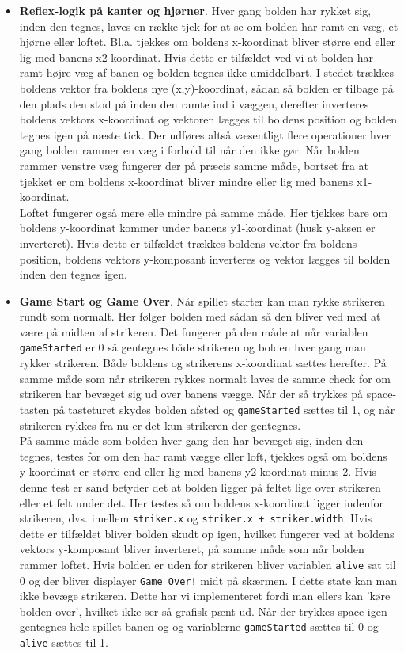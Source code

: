 \begin{itemize}
\item \textbf{Reflex-logik på kanter og hjørner}. Hver gang bolden har rykket sig, inden den tegnes, laves en række tjek for at se om bolden har ramt en væg, et hjørne eller loftet. Bl.a. tjekkes om boldens x-koordinat bliver større end eller lig med banens x2-koordinat. Hvis dette er tilfældet ved vi at bolden har ramt højre væg af banen og bolden tegnes ikke umiddelbart. I stedet trækkes boldens vektor fra boldens nye (x,y)-koordinat, sådan så bolden er tilbage på den plads den stod på inden den ramte ind i væggen, derefter inverteres boldens vektors x-koordinat og vektoren lægges til boldens position og bolden tegnes igen på næste tick. Der udføres altså væsentligt flere operationer hver gang bolden rammer en væg i forhold til når den ikke gør. Når bolden rammer venstre væg fungerer der på præcis samme måde, bortset fra at tjekket er om boldens x-koordinat bliver mindre eller lig med banens x1-koordinat.\\

Loftet fungerer også mere elle mindre på samme måde. Her tjekkes bare om boldens y-koordinat kommer under banens y1-koordinat (husk y-aksen er inverteret). Hvis dette er tilfældet trækkes boldens vektor fra boldens position, boldens vektors y-komposant inverteres og vektor lægges til bolden inden den tegnes igen.


\item \textbf{Game Start og Game Over}. Når spillet starter kan man rykke strikeren rundt som normalt. Her følger bolden med sådan så den bliver ved med at være på midten af strikeren. Det fungerer på den måde at når variablen \texttt{gameStarted} er 0 så gentegnes både strikeren og bolden hver gang man rykker strikeren. Både boldens og strikerens x-koordinat sættes herefter. På samme måde som når strikeren rykkes normalt laves de samme check for om strikeren har bevæget sig ud over banens vægge. Når der så trykkes på space-tasten på tasteturet skydes bolden afsted og \texttt{gameStarted} sættes til 1, og når strikeren rykkes fra nu er det kun strikeren der gentegnes.\\

På samme måde som bolden hver gang den har bevæget sig, inden den tegnes, testes for om den har ramt vægge eller loft, tjekkes også om boldens y-koordinat er større end eller lig med banens y2-koordinat minus 2. Hvis denne test er sand betyder det at bolden ligger på feltet lige over strikeren eller et felt under det. Her testes så om boldens x-koordinat ligger indenfor strikeren, dvs. imellem \texttt{striker.x} og \texttt{striker.x + striker.width}. Hvis dette er tilfældet bliver bolden skudt op igen, hvilket fungerer ved at boldens vektors y-komposant bliver inverteret, på samme måde som når bolden rammer loftet. Hvis bolden er uden for strikeren bliver variablen \texttt{alive} sat til 0 og der bliver displayer \texttt{Game Over!} midt på skærmen. I dette state kan man ikke bevæge strikeren. Dette har vi implementeret fordi man ellers kan 'køre bolden over', hvilket ikke ser så grafisk pænt ud. Når der trykkes space igen gentegnes hele spillet banen og og variablerne \texttt{gameStarted} sættes til 0 og \texttt{alive} sættes til 1.


\end{itemize}
